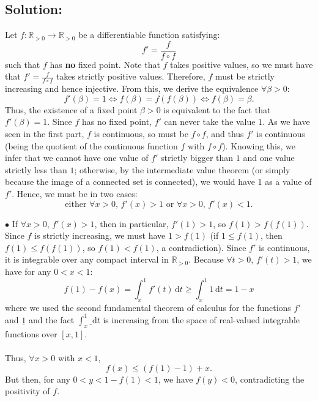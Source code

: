 \documentclass[11pt, a4paper, oneside]{article}
\newcommand{\solution}[1][]{\subsection*{#1}\hfill \par}
\theoremstyle{remark}
\theoremstyle{lemma}
\begin{document}
\solution[Solution:]
Let $f:\mathbb{R}_{>0}\to\mathbb{R}_{>0}$ be a differentiable function satisfying:
\[
f' = \frac{f}{f \circ f}
\]
such that $f$ has \textbf{no} fixed point. Note that $f$ takes positive values, so we must have that $f' = \frac{f}{f \circ f}$ takes strictly positive values. Therefore, $f$ must be strictly increasing and hence injective. From this, we derive the equivalence $\forall \beta>0$:
\[
f'(\beta) = 1 \Leftrightarrow f(\beta) = f(f(\beta)) \Leftrightarrow f(\beta) = \beta.
\]
Thus, the existence of a fixed point $\beta>0$ is equivalent to the fact that $f'(\beta) = 1$. Since $f$ has no fixed point, $f'$ can never take the value $1$. As we have seen in the first part, $f$ is continuous, so must be $f \circ f$, and thus $f'$ is continuous (being the quotient of the continuous function $f$ with $f \circ f$). Knowing this, we infer that we cannot have one value of $f'$ strictly bigger than $1$ and one value strictly less than $1$; otherwise, by the intermediate value theorem (or simply because the image of a connected set is connected), we would have $1$ as a value of $f'$. Hence, we must be in two cases:
$$\text{either }\forall x>0,\, f'(x) > 1\text{ or }\forall x>0,\,f'(x) < 1.$$

$\bullet$ If $\forall x>0$, $f'(x) > 1$, then in particular, $f'(1) > 1$, so $f(1) > f(f(1))$. Since $f$ is strictly increasing, we must have $1 > f(1)$ (if $1 \leq f(1)$, then $f(1) \leq f(f(1))$, so $f(1) < f(1)$, a contradiction). Since $f'$ is continuous, it is integrable over any compact interval in $\mathbb{R}_{>0}$. Because $\forall t>0$, $f'(t) > 1$, we have for any $0 < x < 1$:
\[
f(1) - f(x) = \int_{x}^{1} f'(t) \, \mathrm{d}t \geq \int_{x}^{1} 1 \, \mathrm{d}t = 1 - x
\]
where we used the second fundamental theorem of calculus for the functions $f'$ and $\underline{1}$ and the fact $\int_{x}^{1} \_ \mathrm{d}t$ is increasing from the space of real-valued integrable functions over $[x,1]$.
\\\\
Thus, $\forall x>0$ with $x<1$,
\[
f(x) \leq (f(1) - 1) + x.
\]
But then, for any $0 < y < 1 - f(1)<1$, we have $f(y) < 0$, contradicting the positivity of $f$.
\end{document}
